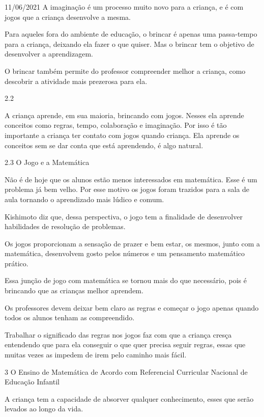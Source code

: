 \documentclass{SchoolBook}
\begin{document}
\begin{day}{11/06/2021}
        A imaginação é um processo muito novo para a criança, e é com jogos que a criança desenvolve a mesma.
        
        Para aqueles fora do ambiente de educação, o brincar é apenas uma passa-tempo para a criança, deixando ela fazer o que quiser. Mas o brincar tem o objetivo de desenvolver a aprendizagem.
        
        O brincar também permite do professor compreender melhor a criança, como descobrir a atividade mais prezerosa para ela.
        
        2.2
        
        A criança aprende, em sua maioria, brincando com jogos. Nesses ela aprende conceitos como regras, tempo, colaboração e imaginação. Por isso é tão importante a criança ter contato com jogos quando criança. Ela aprende os conceitos sem se dar conta que está aprendendo, é algo natural.
        
        2.3 O Jogo e a Matemática
        
        Não é de hoje que os alunos estão menos interessados em matemática. Esse é um problema já bem velho. Por esse motivo os jogos foram trazidos para a sala de aula tornando o aprendizado mais lúdico e comum.
        
        Kishimoto diz que, dessa perspectiva, o jogo tem a finalidade de desenvolver habilidades de resolução de problemas.
        
        Os jogos proporcionam a sensação de prazer e bem estar, os mesmos, junto com a matemática, desenvolvem gosto pelos números e um pensamento matemático prático.
        
        Essa junção de jogo com matemática se tornou mais do que necessário, pois é brincando que as crianças melhor aprendem.
        
        Os professores devem deixar bem claro as regras e começar o jogo apenas quando todos os alunos tenham as compreendido.
        
        Trabalhar o significado das regras nos jogos faz com que a criança cresça entendendo que para ela conseguir o que quer precisa seguir regras, essas que muitas vezes as impedem de irem pelo caminho mais fácil.
        
        3 O Ensino de Matemática de Acordo com Referencial Curricular Nacional de Educação Infantil
        
        A criança tem a capacidade de absorver qualquer conhecimento, esses que serão levados ao longo da vida.
        

\end{day}
\end{document}

